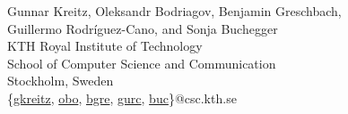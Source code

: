 % 





\begin{center}
Gunnar Kreitz, Oleksandr Bodriagov, Benjamin Greschbach,\\
Guillermo Rodr\'{i}guez-Cano, and Sonja Buchegger\\[2em]

KTH Royal Institute of Technology\\
School of Computer Science and Communication\\
Stockholm, Sweden\\
\{\href{gkreitz@csc.kth.se}{gkreitz}, \href{obo@csc.kth.se}{obo}, 
\href{bgre@csc.kth.se}{bgre}, \href{gurc@csc.kth.se}{gurc}, \href{buc@csc.kth.se}{buc}\}@csc.kth.se
\end{center}


